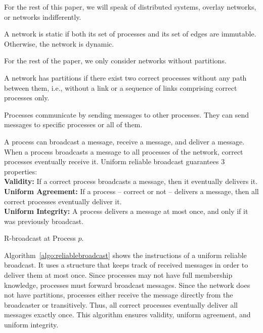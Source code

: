 For the rest of this paper, we will speak of distributed systems, overlay
networks, or networks indifferently.

\begin{definition}
  A network is static if both its set of processes and its set of edges are
  immutable. Otherwise, the network is dynamic.
\end{definition}

For the rest of the paper, we only consider networks without partitions.

\begin{definition}
  A network has partitions if there exist two correct processes without any path
  between them, i.e., without a link or a sequence of links comprising correct
  processes only.
\end{definition}


Processes communicate by sending messages to other processes. They can send
messages to specific processes or all of them.

\begin{definition}
  A process can broadcast a message, receive a message, and deliver a message.
  When a process broadcasts a message to all processes of the network, correct
  processes eventually receive it. 
  Uniform reliable broadcast guarantees 3 properties: \\
  \textbf{Validity:} If a correct process broadcasts a message, then it
  eventually delivers it. \\
  \textbf{Uniform Agreement:} If a process -- correct or not -- delivers a
  message, then all correct processes eventually deliver it. \\
  \textbf{Uniform Integrity:} A process delivers a message at most once, and
  only if it was previously broadcast.
\end{definition}

\begin{algorithm}[h]
  
  \caption{\label{algo:reliablebroadcast}R-broadcast at Process $p$.}
\end{algorithm}

Algorithm~\ref{algo:reliablebroadcast} shows the instructions of a uniform
reliable broadcast. It uses a structure that keeps track of received messages in
order to deliver them at most once. 
Since processes may not have full membership knowledge, processes must forward
broadcast messages. Since the network does not have partitions, processes either
receive the message directly from the broadcaster or transitively. Thus, all
correct processes eventually deliver all messages exactly once. This algorithm
ensures validity, uniform agreement, and uniform integrity.


